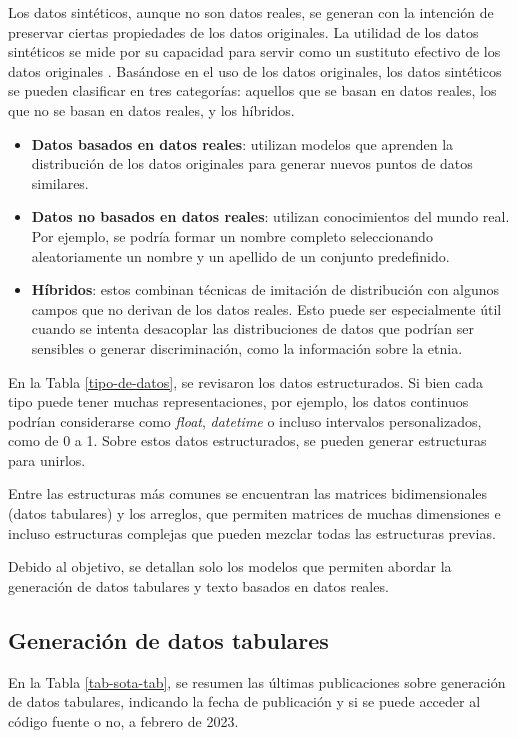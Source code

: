 Los datos sintéticos, aunque no son datos reales, se generan con la intención de preservar ciertas propiedades de los datos originales. La utilidad de los datos sintéticos se mide por su capacidad para servir como un sustituto efectivo de los datos originales \cite{bruce_practical_2020}. Basándose en el uso de los datos originales, los datos sintéticos se pueden clasificar en tres categorías: aquellos que se basan en datos reales, los que no se basan en datos reales, y los híbridos.

\begin{itemize}
    \item \textbf{Datos basados en datos reales}: utilizan modelos que aprenden la distribución de los datos originales para generar nuevos puntos de datos similares.
    \item \textbf{Datos no basados en datos reales}: utilizan conocimientos del mundo real. Por ejemplo, se podría formar un nombre completo seleccionando aleatoriamente un nombre y un apellido de un conjunto predefinido.
    \item \textbf{Híbridos}: estos combinan técnicas de imitación de distribución con algunos campos que no derivan de los datos reales. Esto puede ser especialmente útil cuando se intenta desacoplar las distribuciones de datos que podrían ser sensibles o generar discriminación, como la información sobre la etnia.
\end{itemize}
    
En la Tabla \ref{tipo-de-datos}, se revisaron los datos estructurados. Si bien cada tipo puede tener muchas representaciones, por ejemplo, los datos continuos podrían considerarse como \emph{float}, \emph{datetime} o incluso intervalos personalizados, como de 0 a 1. Sobre estos datos estructurados, se pueden generar estructuras para unirlos.

Entre las estructuras más comunes se encuentran las matrices bidimensionales (datos tabulares) y los arreglos, que permiten matrices de muchas dimensiones e incluso estructuras complejas que pueden mezclar todas las estructuras previas.

Debido al objetivo, se detallan solo los modelos que permiten abordar la generación de datos tabulares y texto basados en datos reales.
\subsection{Generación de datos tabulares}
En la Tabla \ref{tab-sota-tab}, se resumen las últimas publicaciones sobre generación de datos tabulares, indicando la fecha de publicación y si se puede acceder al código fuente o no, a febrero de 2023.

